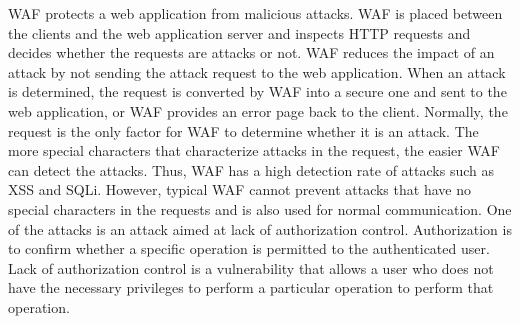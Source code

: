 \documentclass[conference]{IEEEtran}
\begin{document}
WAF protects a web application from malicious attacks.
WAF is placed between the clients and the web application server and inspects HTTP requests and decides whether the requests are attacks or not.
WAF reduces the impact of an attack by not sending the attack request to the web application.
When an attack is determined, the request is converted by WAF into a secure one and sent to the web application, or WAF provides an error page back to the client.
Normally, the request is the only factor for WAF to determine whether it is an attack.
The more special characters that characterize attacks in the request, the easier WAF can detect the attacks.
Thus, WAF has a high detection rate of attacks such as XSS and SQLi.
However, typical WAF cannot prevent attacks that have no special characters in the requests and is also used for normal communication.
One of the attacks is an attack aimed at lack of authorization control.
Authorization is to confirm whether a specific operation is permitted to the authenticated user.
Lack of authorization control is a vulnerability that allows a user who does not have the necessary privileges to perform a particular operation to perform that operation.

\end{document}

